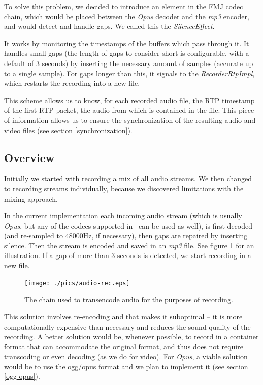 \documentclass[twoside,openright,a4paper,12pt,english]{article}
\begin{document}
To solve this problem, we decided to introduce an element in the FMJ codec chain, which
would be placed between the \emph{Opus} decoder and the \emph{mp3} encoder, and would detect and
handle gaps. We called this the \emph{SilenceEffect}.

It works by monitoring the timestamps of the buffers which pass through it. It
handles small gaps (the length of gaps to consider short is configurable, with
a default of 3 seconds) by inserting the necessary amount of samples (accurate
up to a single sample). For gaps longer than this, it signals to the
\emph{RecorderRtpImpl}, which restarts the recording into a new file.

This scheme allows us to know, for each recorded audio file, the RTP timestamp
of the first RTP packet, the audio from which is contained in the file. This piece of
information allows us to ensure the synchronization of the resulting audio and video files (see
section \ref{synchronization}).


\subsection{Overview}
Initially we started with recording a mix of all audio streams.
We then changed to recording streams individually, because we discovered
limitations with the mixing approach.

In the current implementation each incoming audio stream (which is usually \emph{Opus}, but any of the codecs
supported in \lj\ can be used as well), is first decoded (and re-sampled to
48000Hz, if necessary), then gaps are repaired by inserting silence. Then the
stream is encoded and saved in an \emph{mp3} file. See figure \ref{audio-rec}
for an illustration. If a gap of more than 3 seconds is detected, we start
recording in a new file.

\begin{figure}[h]
    \texttt{[image: ./pics/audio-rec.eps]}
    \caption{The chain used to transencode audio for the purposes of recording.}
    \label{audio-rec}
\end{figure}

This solution involves re-encoding and that makes it suboptimal -- it is 
more computationally expensive than necessary and reduces the sound quality of the recording.
A better solution would be, whenever possible, to record in a container format
that can accommodate the original format, and thus does not require
transcoding or even decoding (as we do for video). For \emph{Opus}, a viable
solution would be to use the ogg/opus format and we plan to implement it (see
section \ref{ogg-opus}).
\end{document}
